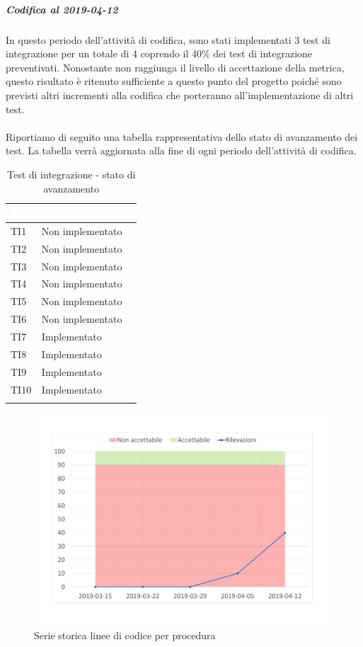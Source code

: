 \subparagraph{Codifica al 2019-04-12}
In questo periodo dell'attività di codifica, sono stati implementati 3 test di integrazione per un totale di 4 coprendo il 40\% dei test di integrazione preventivati.
Nonostante non raggiunga il livello di accettazione della
metrica, questo risultato è ritenuto sufficiente a questo punto del progetto poiché sono previsti altri incrementi alla codifica che porteranno all'implementazione di altri test. \\
\\
Riportiamo di seguito una tabella rappresentativa dello stato di avanzamento dei test. La tabella verrà aggiornata alla fine di ogni periodo dell'attività di codifica.

	\begin{longtable}{|>{\centering\arraybackslash}m{1.6cm}|>{\centering\arraybackslash}m{6.41cm}|>{\centering\arraybackslash}m{3.1cm}|}		
	\rowcolor{LightBlue}
	\textbf{\textcolor{white}{Test}}
	& \textbf{\textcolor{white}{Stato}}\\
	\hline
	TI1
	& Non implementato
	\\ \hline
	\rowcolor{LightGray}
	TI2
	& Non implementato
	\\ \hline
	TI3
	& Non implementato
	\\ \hline
	\rowcolor{LightGray}
	TI4
	& Non implementato
	\\ \hline
	TI5
	& Non implementato
	\\ \hline
	\rowcolor{LightGray}
	TI6
	& Non implementato
	\\ \hline	
	TI7
	& Implementato
	\\ \hline	
	\rowcolor{LightGray}
	TI8
	& Implementato
	\\ \hline	
	TI9
	& Implementato
	\\ \hline	
	\rowcolor{LightGray}
	TI10
	& Implementato
	\\ \hline	
	\caption{Test di integrazione - stato di avanzamento}
\end{longtable}

\begin{figure}[H]
	\centering
	\includegraphics[scale=0.6]{images/resoconto/MPC4Chart.pdf}
	\caption{Serie storica linee di codice per procedura}	
\end{figure}

